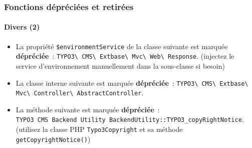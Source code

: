 \begin{frame}[fragile]
	\frametitle{Fonctions dépréciées et retirées}
	\framesubtitle{Divers (2)}

	\lstset{basicstyle=\tiny\ttfamily}

	\begin{itemize}

		\item La propriété \texttt{\$environmentService} de la classe suivante est marquée \textbf{dépréciée}~:
			\texttt{TYPO3\textbackslash
				CMS\textbackslash
				Extbase\textbackslash
				Mvc\textbackslash
				Web\textbackslash
				Response}.\newline
			\smaller
				(injectez le service d'environnement manuellement dans la sous-classe si besoin)
			\normalsize

		\item La classe interne suivante est marquée \textbf{dépréciée}~:\newline
			\texttt{TYPO3\textbackslash
				CMS\textbackslash
				Extbase\textbackslash
				Mvc\textbackslash
				Controller\textbackslash
				AbstractController}.

		\item La méthode suivante est marquée \textbf{dépréciée}~:\newline
			\texttt{TYPO3\
				CMS\
				Backend\
				Utility\
				BackendUtility::TYPO3\_copyRightNotice}.\newline
				\smaller
					(utilisez la classe PHP \texttt{Typo3Copyright} et sa méthode \texttt{getCopyrightNotice()})
				\normalsize

	\end{itemize}

\end{frame}


